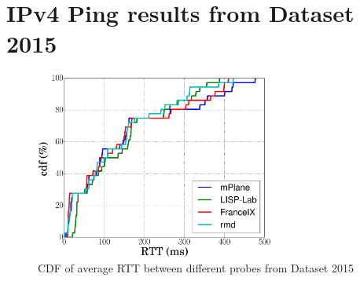 \section{IPv4 Ping results from Dataset 2015}
\label{sec:pxtr_ping_v4_2015}
    \begin{figure}[!t]
     	\centering
     	\includegraphics[width=0.7\textwidth]{Pics/2015/CDF_RTT_avg.eps}
     	\caption{CDF of average RTT between different probes from Dataset 2015}
     	\label{CDF_RTT_avg_v4_2015}
     \end{figure}
    
